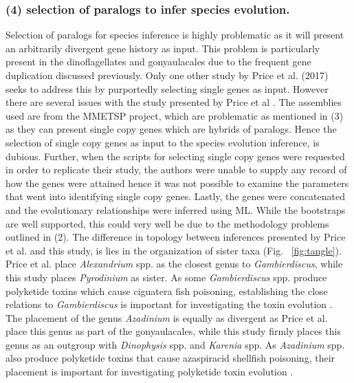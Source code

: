 \documentclass[12pt]{article}
\begin{document}
\subsubsection*{(4) selection of paralogs to infer species evolution.}
Selection of paralogs for species inference is highly problematic as it will present an arbitrarily divergent gene history as input. 
This problem is particularly present in the dinoflagellates and gonyaulacales due to the frequent gene duplication discussed previously. %
Only one other study by Price et al. (2017) seeks to address this by purportedly selecting single genes as input. 
However there are several issues with the study presented by Price et al \cite{price2017robust}. 
The assemblies used are from the MMETSP project, which are problematic as mentioned in (3) as they can present single copy genes which are hybrids of paralogs. 
Hence the selection of single copy genes as input to the species evolution inference, is dubious. 
Further, when the scripts for selecting single copy genes were requested in order to replicate their study, the authors were unable to supply any record of how the genes were attained hence it was not possible to examine the parameters that went into identifying single copy genes. 
Lastly, the genes were concatenated and the evolutionary relationships were inferred using ML. While the bootstraps are well supported, this could very well be due to the methodology problems outlined in (2).
The difference in topology between inferences presented by Price et al. and this study, is lies in the organization of sister taxa (Fig. ~\ref{fig:tangle}). 
Price et al. place \emph{Alexandrium} spp. as the closest genus to \emph{Gambierdiscus}, while this study places \emph{Pyrodinium} as sister. 
As some \emph{Gambierdiscus} spp. produce polyketide toxins which cause ciguatera fish poisoning, establishing the close relations to \emph{Gambierdiscus} is important for investigating the toxin evolution \cite{pawlowiez2014transcriptome}.
The placement of the genus \emph{Azadinium} is equally as divergent as Price et al. place this genus as part of the gonyaulacales, while this study firmly places this genus as an outgroup with \emph{Dinophysis} spp. and \emph{Karenia} spp.
As \emph{Azadinium} spp. also produce polyketide toxins that cause azaspiracid shellfish poisoning, their placement is important for investigating polyketide toxin evolution \cite{meyer2015transcriptomic}.
\end{document}
